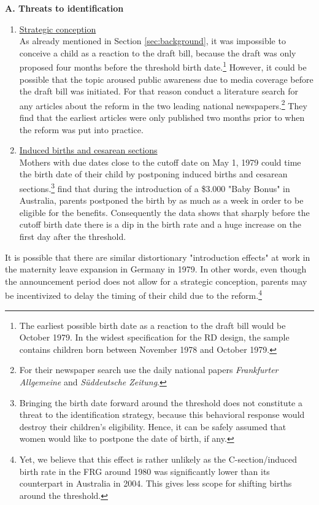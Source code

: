 \documentclass[11pt, a4paper]{article} %
\begin{document}
\bigskip\bigskip
\textbf{A. Threats to identification}
\begin{enumerate}
	\item \underline{Strategic conception}\\ As already mentioned in Section \ref{sec:background}, it was impossible to conceive a child as a reaction to the draft bill, because the draft was only proposed four months before the threshold birth date.\footnote{The earliest possible birth date as a reaction to the draft bill would be October 1979. In the widest specification for the RD design, the sample contains children born between November 1978 and October 1979.} However, it could be possible that the topic aroused public awareness due to media coverage before the draft bill was initiated. For that reason \cite{Dustmann2012} conduct a literature search for any articles about the reform in the two leading national newspapers.\footnote{For their newspaper search \cite{Dustmann2012} use the daily national papers \emph{Frankfurter Allgemeine} and \emph{Süddeutsche Zeitung}.} They find that the earliest articles were only published two months prior to when the reform was put into practice.
	
	\item \underline{Induced births and cesarean sections}\\ Mothers with due dates close to the cutoff date on May 1, 1979 could time the birth date of their child by postponing induced births and cesarean sections.\footnote{Bringing the birth date forward around the threshold does not constitute a threat to the identification strategy, because this behavioral response would destroy their children's eligibility. Hence, it can be safely assumed that women would like to postpone the date of birth, if any.} \cite{gans2009born} find that during the introduction of a \$3.000 "Baby Bonus" in Australia, parents postponed the birth by as much as a week in order to be eligible for the benefits. Consequently the data shows that sharply before the cutoff birth date there is a dip in the birth rate and a huge increase on the first day after the threshold.
\end{enumerate}
It is possible that there are similar distortionary "introduction effects" at work in the maternity leave expansion in Germany in 1979. In other words, even though the announcement period does not allow for a strategic conception, parents may be incentivized to delay the timing of their child due to the reform.\footnote{Yet, we believe that this effect is rather unlikely as the C-section/induced birth rate in the FRG around 1980 was significantly lower than its counterpart in Australia in 2004. This gives less scope for shifting births around the threshold. } %
\end{document}
